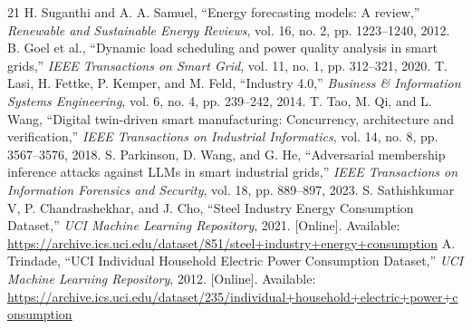 \documentclass[journal]{IEEEtran}
\begin{document}
\begin{thebibliography}{21}
 H. Suganthi and A. A. Samuel, ``Energy forecasting models: A review,'' \emph{Renewable and Sustainable Energy Reviews}, vol. 16, no. 2, pp. 1223--1240, 2012.
 B. Goel et al., ``Dynamic load scheduling and power quality analysis in smart grids,'' \emph{IEEE Transactions on Smart Grid}, vol. 11, no. 1, pp. 312--321, 2020.
 T. Lasi, H. Fettke, P. Kemper, and M. Feld, ``Industry 4.0,'' \emph{Business \& Information Systems Engineering}, vol. 6, no. 4, pp. 239--242, 2014.
 T. Tao, M. Qi, and L. Wang, ``Digital twin-driven smart manufacturing: Concurrency, architecture and verification,'' \emph{IEEE Transactions on Industrial Informatics}, vol. 14, no. 8, pp. 3567--3576, 2018.
 S. Parkinson, D. Wang, and G. He, ``Adversarial membership inference attacks against LLMs in smart industrial grids,'' \emph{IEEE Transactions on Information Forensics and Security}, vol. 18, pp. 889--897, 2023.
 S. Sathishkumar V, P. Chandrashekhar, and J. Cho, ``Steel Industry Energy Consumption Dataset,'' \emph{UCI Machine Learning Repository}, 2021. [Online]. Available: \url{https://archive.ics.uci.edu/dataset/851/steel+industry+energy+consumption}
 A. Trindade, ``UCI Individual Household Electric Power Consumption Dataset,'' \emph{UCI Machine Learning Repository}, 2012. [Online]. Available: \url{https://archive.ics.uci.edu/dataset/235/individual+household+electric+power+consumption}
\end{thebibliography}
\end{document}
